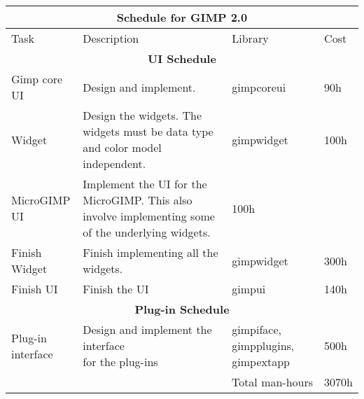 \begin{flushleft}
\begin{tabular}{|p{2cm}|p{5cm}|p{2cm}|l|}\hline
\multicolumn{4}{|c|}{\rule[-3mm]{0mm}{8mm} \large \bf Schedule for GIMP 2.0}\\  
\hline
Task & Description & Library & Cost\\ 
\hline 

\multicolumn{4}{|c|}{\bf UI Schedule}\\
\hline 
Gimp core UI & Design and implement. & gimpcoreui & 90h\\
\hline
Widget & Design the widgets. The widgets must be data type and color model independent. & gimpwidget &100h\\
\hline
\raggedright{MicroGIMP\\ UI} & \raggedright{Implement the UI for the MicroGIMP. This also involve implementing some of the underlying widgets.} & 100h\\
\hline
\raggedright{Finish\\ Widget} & \raggedright{Finish implementing all the \\ widgets.} & gimpwidget & 300h\\
\hline
Finish UI & Finish the UI & gimpui & 140h\\
\hline 

\multicolumn{4}{|c|}{\bf Plug-in Schedule}\\
\hline
\raggedright{Plug-in\\ interface} & \raggedright{Design and implement the interface\\ for the plug-ins} & gimpiface, gimpplugins, gimpextapp & 500h\\ 
\hline
 
\multicolumn{3}{|r|}{Total man-hours} & 3070h\\
\hline
\end{tabular}
\end{flushleft}

	

